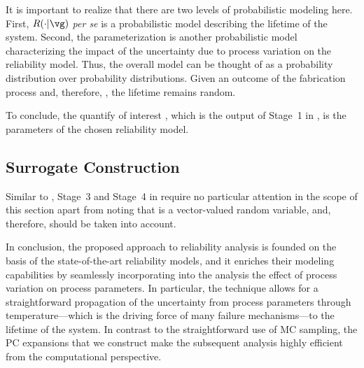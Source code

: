 \begin{remark} 
It is important to realize that there are two levels of probabilistic modeling
here. First, $R(\cdot | \vg)$ \emph{per se} is a probabilistic model describing
the lifetime of the system. Second, the parameterization \vg is another
probabilistic model characterizing the impact of the uncertainty due to process
variation on the reliability model. Thus, the overall model can be thought of as
a probability distribution over probability distributions. Given an outcome of
the fabrication process and, therefore, \vg, the lifetime remains random.
\end{remark}

To conclude, the quantify of interest \g, which is the output of Stage~1 in
, is the parameters \vg of the chosen reliability model.

\subsection{Surrogate Construction}

Similar to , Stage~3 and Stage~4 in
 require no particular attention in the scope of this
section apart from noting that \vg is a vector-valued random variable, and,
therefore,  should be taken into account.

\conclusioncut
In conclusion, the proposed approach to reliability analysis is founded on the
basis of the state-of-the-art reliability models, and it enriches their modeling
capabilities by seamlessly incorporating into the analysis the effect of process
variation on process parameters. In particular, the technique allows for a
straightforward propagation of the uncertainty from process parameters through
temperature---which is the driving force of many failure mechanisms---to the
lifetime of the system. In contrast to the straightforward use of \ac{MC}
sampling, the \ac{PC} expansions that we construct make the subsequent analysis
highly efficient from the computational perspective.
